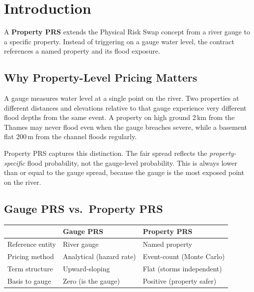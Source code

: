 \documentclass[11pt,a4paper]{article}
\begin{document}
\mkmtitlepage
\mkmlegalpage

\tableofcontents
\clearpage


\section{Introduction}

A \textbf{Property PRS} extends the Physical Risk Swap concept from a
river gauge to a specific property.  Instead of triggering on a gauge
water level, the contract references a named property and its flood
exposure.

\subsection{Why Property-Level Pricing Matters}

A gauge measures water level at a single point on the river.  Two
properties at different distances and elevations relative to that gauge
experience very different flood depths from the same event.  A property
on high ground 2\,km from the Thames may never flood even when the gauge
breaches severe, while a basement flat 200\,m from the channel floods
regularly.

Property PRS captures this distinction.  The fair spread reflects the
\emph{property-specific} flood probability, not the gauge-level
probability.  This is always lower than or equal to the gauge spread,
because the gauge is the most exposed point on the river.

\subsection{Gauge PRS vs.\ Property PRS}

\begin{center}
\begin{tabular}{lll}
\toprule
& \textbf{Gauge PRS} & \textbf{Property PRS} \\
\midrule
Reference entity & River gauge & Named property \\
Pricing method   & Analytical (hazard rate) & Event-count (Monte Carlo) \\
Term structure   & Upward-sloping & Flat (storms independent) \\
Basis to gauge   & Zero (is the gauge) & Positive (property safer) \\
\bottomrule
\end{tabular}
\end{center}
\end{document}
